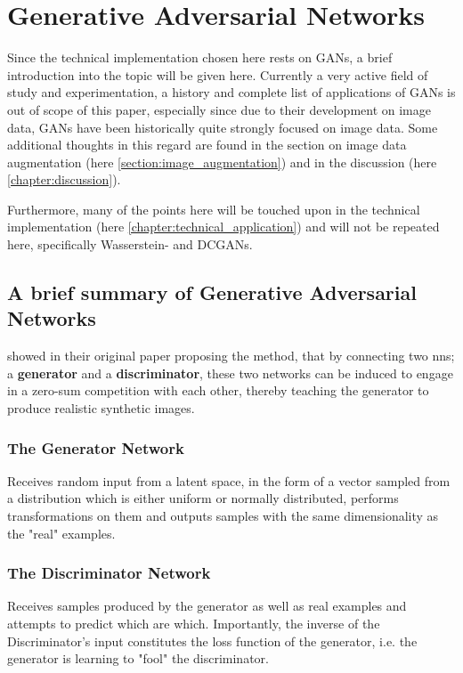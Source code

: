 \chapter{Generative Adversarial Networks}
\label{chapter:gan}

Since the technical implementation chosen here rests on \acp{GAN}, a brief introduction into the topic will be given here. Currently a very active field of study and experimentation, a history and complete list of applications of \acp{GAN} is out of scope of this paper, especially since due to their development on image data, \acp{GAN} have been historically quite strongly focused on image data. Some additional thoughts in this regard are found in the section on image data augmentation (here \ref{section:image_augmentation}) and in the discussion (here \ref{chapter:discussion}).

Furthermore, many of the points here will be touched upon in the technical implementation (here \ref{chapter:technical_application}) and will not be repeated here, specifically Wasserstein- and \acp{DCGAN}.

\pagebreak

\section{A brief summary of Generative Adversarial Networks}

\cite{goodfellow2014generative} showed in their original paper proposing the method, that by connecting two \acp{nn}; a \textbf{generator} and a \textbf{discriminator}, these two networks can be induced to engage in a zero-sum competition with each other, thereby teaching the generator to produce realistic synthetic images. 

\subsection{The Generator Network}

Receives random input from a latent space, in the form of a vector sampled from a distribution which is either uniform or normally distributed, performs transformations on them and outputs samples with the same dimensionality as the "real" examples.

\subsection{The Discriminator Network}

Receives samples produced by the generator as well as real examples and attempts to predict which are which. Importantly, the inverse of the Discriminator's input constitutes the loss function of the generator, i.e. the generator is learning to "fool" the discriminator.

